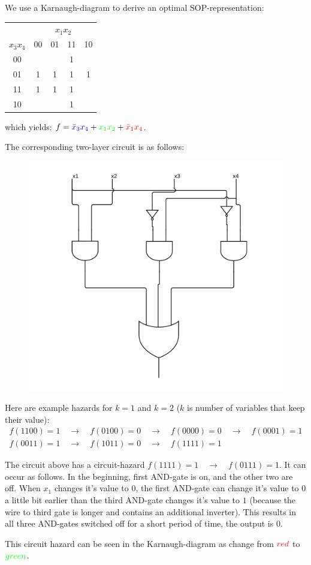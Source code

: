\documentclass[10pt,a4paper]{scrartcl}
\newcommand{\subExercise}[1]{\vspace{0.5em} \noindent{\bf #1)}}
\begin{document}
\subExercise{a} We use a Karnaugh-diagram to derive an optimal SOP-representation:

\begin{tabular}{|c||c|c|c|c|}
  \hline
    & \multicolumn{4}{c|}{$x_1x_2$} \\
$x_3x_4$ & 00                   & 01                    & 11                 & 10               \\ \hline\hline
    00   &                      &                       & \cellcolor{green}1 &                  \\ \hline
    01   & \cellcolor{magenta}1 & \cellcolor{magenta}1  & \cellcolor{gray}1  & \cellcolor{blue}1 \\ \hline
    11   & \cellcolor{red}1     & \cellcolor{red}1      & \cellcolor{green}1 &                  \\ \hline
    10   &                      &                       & \cellcolor{green}1 &                  \\
  \hline
\end{tabular}

which yields: $f   =  \textcolor{blue}{\bar x_3 x_4} +
                      \textcolor{green}{x_1 x_2} +
                      \textcolor{red}{\bar x_1 x_4}$.

The corresponding two-layer circuit is as follows:

\begin{figure}
  \centering\includegraphics[width=0.4\linewidth]{images/exercise_6_3.png}
\end{figure}
\FloatBarrier

\subExercise{b} Here are example hazards for $k=1$ and $k=2$ ($k$ is number of variables that keep their value):
\begin{align*}
  f(1100) = 1 \quad \to \quad f(0100) = 0 \quad \to \quad f(0000) = 0 \quad \to \quad f(0001) = 1 \\
  f(0011) = 1 \quad \to \quad f(1011) = 0 \quad \to \quad f(1111) = 1
\end{align*}

\subExercise{c} The circuit above has a circuit-hazard $f(1111) = 1 \quad \to \quad f(0111) = 1$.
It can occur as follows. In the beginning, first AND-gate is on, and the other two are off. When 
$x_1$ changes it's value to $0$, the first AND-gate can change it's value to $0$ a little bit earlier
than the third AND-gate changes it's value to $1$ (because the wire to third gate is longer and 
contains an additional inverter). This results in all three AND-gates switched off for a short 
period of time, the output is $0$.

This circuit hazard can be seen in the Karnaugh-diagram as change from $\textcolor{red}{red}$ to $\textcolor{green}{green}$.
\end{document}
